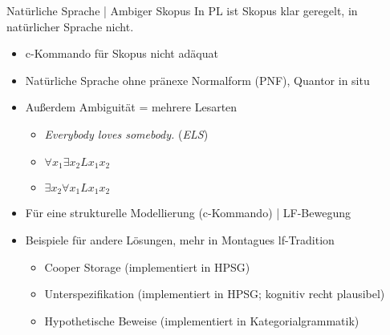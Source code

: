 \begin{frame}
  {Natürliche Sprache | Ambiger Skopus}
  \onslide<+->
  \onslide<+->
  In PL ist Skopus klar geregelt, in natürlicher Sprache nicht.\\
  \Halbzeile
  \begin{itemize}[<+->]
    \item c-Kommando für Skopus nicht adäquat
    \item Natürliche Sprache ohne \alert{pränexe Normalform} (PNF), Quantor in situ
    \item Außerdem \alert{Ambiguität = mehrere Lesarten}
      \begin{itemize}[<+->]
        \item \emph{Everybody loves somebody.} (\emph{ELS})
        \item $\forall{}x_1\exists{}x_2Lx_1x_2$
        \item $\exists{}x_2\forall{}x_1Lx_1x_2$
      \end{itemize}
      \Halbzeile
    \item Für eine strukturelle Modellierung (c-Kommando) | \alert{LF-Bewegung}
    \item Beispiele für andere Lösungen, mehr in Montagues lf-Tradition
      \begin{itemize}[<+->]
        \item \alert{Cooper Storage} (implementiert in HPSG)
        \item \alert{Unterspezifikation} (implementiert in HPSG; kognitiv recht plausibel)
        \item \alert{Hypothetische Beweise} (implementiert in Kategorialgrammatik)
      \end{itemize}
  \end{itemize}
\end{frame}


